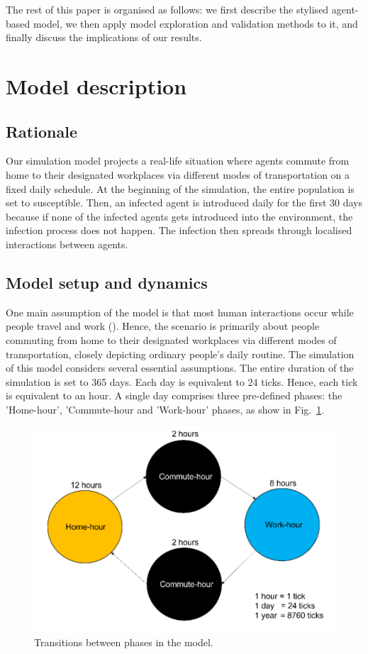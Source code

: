 \documentclass[smallextended]{svjour3}       %
\begin{document}
The rest of this paper is organised as follows: we first describe the stylised agent-based model, we then apply model exploration and validation methods to it, and finally discuss the implications of our results.




\section{Model description}


\subsection{Rationale}

Our simulation model projects a real-life situation where agents commute from home to their designated workplaces via different modes of transportation on a fixed daily schedule. At the beginning of the simulation, the entire population is set to susceptible. Then, an infected agent is introduced daily for the first 30 days because if none of the infected agents gets introduced into the environment, the infection process does not happen. The infection then spreads through localised interactions between agents.


\subsection{Model setup and dynamics}

One main assumption of the model is that most human interactions occur while people travel and work ().%
 Hence, the scenario is primarily about people commuting from home to their designated workplaces via different modes of transportation, closely depicting ordinary people's daily routine. The simulation of this model considers several essential assumptions. The entire duration of the simulation is set to 365 days. Each day is equivalent to 24 ticks. Hence, each tick is equivalent to an hour. A single day comprises three pre-defined phases: the 'Home-hour', 'Commute-hour and 'Work-hour' phases, as show in Fig.~\ref{fig:modeltrans}.

\begin{figure}
	\centering
	\includegraphics[width=0.5\linewidth]{figures/ModelTransitions.png}
	\caption{Transitions between phases in the model.\label{fig:modeltrans}}
\end{figure}
\end{document}

